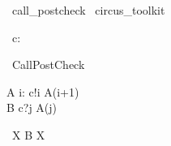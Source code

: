 \begin{zsection}
  \SECTION\ call\_postcheck \parents\ circus\_toolkit
\end{zsection}

\begin{circus}
   \circchannel\ c: \nat
\end{circus}

\begin{circus}
   \circprocess\ CallPostCheck \circdef \circbegin
\end{circus}

\begin{circusaction}
    A \circdef i: \nat \circspot c!i \then A(i+1) \\
    B \circdef c?j \then A(j)
\end{circusaction}

\begin{circusaction}
     \circspot\ \circmu X \circspot B \circseq X
\end{circusaction}

\begin{circus}
   \circend
\end{circus}

